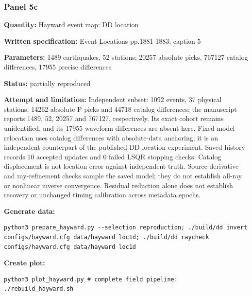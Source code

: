 \subsubsection*{Panel 5c}
\noindent\textbf{Quantity:} Hayward event map: DD location\par
\noindent\textbf{Written specification:} Event Locations pp.1881-1883; caption 5\par
\noindent\textbf{Parameters:} 1489 earthquakes, 52 stations; 20257 absolute picks, 767127 catalog differences, 17955 precise differences\par
\noindent\textbf{Status:} partially reproduced\par
\noindent\textbf{Attempt and limitation:} Independent subset: 1092 events, 37 physical stations, 14262 absolute P picks and 44718 catalog differences; the manuscript reports 1489, 52, 20257 and 767127, respectively. Its exact cohort remains unidentified, and its 17955 waveform differences are absent here. Fixed-model relocation uses catalog differences with absolute-data anchoring; it is an independent counterpart of the published DD-location experiment. Saved history records 10 accepted updates and 0 failed LSQR stopping checks. Catalog displacement is not location error against independent truth. Source-derivative and ray-refinement checks sample the saved model; they do not establish all-ray or nonlinear inverse convergence. Residual reduction alone does not establish recovery or unchanged timing calibration across metadata epochs.\par
\noindent\textbf{Generate data:}
\begin{lstlisting}
python3 prepare_hayward.py --selection reproduction; ./build/dd invert configs/hayward.cfg data/hayward loc1d; ./build/dd raycheck configs/hayward.cfg data/hayward loc1d
\end{lstlisting}
\noindent\textbf{Create plot:}
\begin{lstlisting}
python3 plot_hayward.py # complete field pipeline: ./rebuild_hayward.sh
\end{lstlisting}
